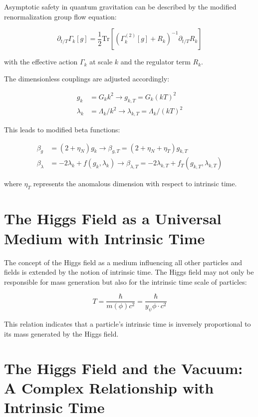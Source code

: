\documentclass{article}
\begin{document}
	Asymptotic safety in quantum gravitation can be described by the modified renormalization group flow equation:
	
	\begin{equation}
		\partial_{t/T} \Gamma_k[g] = \frac{1}{2} \text{Tr}\left[\left(\Gamma_k^{(2)}[g] + R_k\right)^{-1} \partial_{t/T} R_k\right]
	\end{equation}
	
	with the effective action \(\Gamma_k\) at scale \(k\) and the regulator term \(R_k\).
	
	The dimensionless couplings are adjusted accordingly:
	
	\begin{align}
		g_k &= G_k k^2 \rightarrow g_{k,T} = G_k (kT)^2 \\
		\lambda_k &= \Lambda_k/k^2 \rightarrow \lambda_{k,T} = \Lambda_k/(kT)^2
	\end{align}
	
	This leads to modified beta functions:
	
	\begin{align}
		\beta_g &= (2 + \eta_N)g_k \rightarrow \beta_{g,T} = (2 + \eta_N + \eta_T)g_{k,T} \\
		\beta_\lambda &= -2\lambda_k + f(g_k,\lambda_k) \rightarrow \beta_{\lambda,T} = -2\lambda_{k,T} + f_T(g_{k,T},\lambda_{k,T})
	\end{align}
	
	where \(\eta_T\) represents the anomalous dimension with respect to intrinsic time.
	
	\section{The Higgs Field as a Universal Medium with Intrinsic Time}
	
	The concept of the Higgs field as a medium influencing all other particles and fields is extended by the notion of intrinsic time. The Higgs field may not only be responsible for mass generation but also for the intrinsic time scale of particles:
	
	\begin{equation}
		T = \frac{\hbar}{m(\phi)c^2} = \frac{\hbar}{y_\psi \phi \cdot c^2}
	\end{equation}
	
	This relation indicates that a particle's intrinsic time is inversely proportional to its mass generated by the Higgs field.
	
	\section{The Higgs Field and the Vacuum: A Complex Relationship with Intrinsic Time}
	
\end{document}
